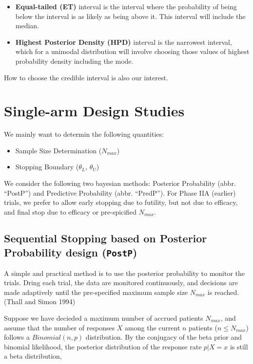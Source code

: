 \documentclass[]{article}
\providecommand{\tightlist}{%
  \setlength{\itemsep}{0pt}\setlength{\parskip}{0pt}}
\begin{document}
\begin{itemize}
\tightlist
\item
  \textbf{Equal-tailed (ET)} interval is the interval where the
  probability of being below the interval is as likely as being above
  it. This interval will include the median.
\item
  \textbf{Highest Posterior Density (HPD)} interval is the narrowest
  interval, which for a unimodal distribution will involve choosing
  those values of highest probability density including the mode.
\end{itemize}

How to choose the credible interval is also our interest.

\section{Single-arm Design Studies}\label{single-arm-design-studies}

We mainly want to determin the following quantities:

\begin{itemize}
\tightlist
\item
  Sample Size Determination (\(N_{max}\))
\item
  Stopping Boundary (\(\theta_L\), \(\theta_U\))
\end{itemize}

We consider the following two bayesian methods: Posterior Probability
(abbr. ``PostP'') and Predictive Probability (abbr. ``PredP''). For
Phase IIA (earlier) trials, we prefer to allow early stopping due to
futility, but not due to efficacy, and final stop due to efficacy or
pre-spicified \(N_{max}\).

\subsection{\texorpdfstring{Sequential Stopping based on Posterior
Probability design
(\texttt{PostP})}{Sequential Stopping based on Posterior Probability design (PostP)}}\label{sequential-stopping-based-on-posterior-probability-design-postp}

A simple and practical method is to use the posterior probability to
monitor the trials. Dring each trial, the data are monitored
continuously, and decisions are made adaptively until the pre-specified
maximum sample size \(N_{max}\) is reached.(Thall and Simon 1994)

Suppose we have decieded a maximum number of accrued patients
\(N_{max}\), and assume that the number of responses \(X\) among the
current \(n\) patients (\(n \le N_{max}\)) follows a \(Binomial(n, p)\)
distribution. By the conjugacy of the beta prior and binomial
likelihood, the posterior distribution of the response rate \(p|X=x\) is
still a beta distribution,
\end{document}

